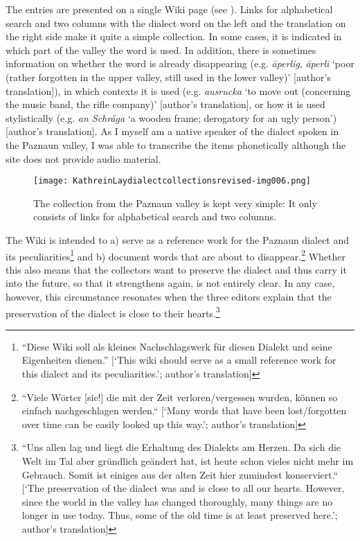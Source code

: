\documentclass[output=paper]{langscibook}
\begin{document}
The entries are presented on a single Wiki page (see ). Links for alphabetical search and two columns with the dialect word on the left and the translation on the right side make it quite a simple collection. In some cases, it is indicated in which part of the valley the word is used. In addition, there is sometimes information on whether the word is already disappearing (e.g. \textit{āperlig}, \textit{āperli} ‘poor (rather forgotten in the upper valley, still used in the lower valley)’ [author’s translation]), in which contexts it is used (e.g. \textit{ausrucka} ‘to move out (concerning the music band, the rifle company)’ [author’s translation], or how it is used stylistically (e.g. \textit{an Schråga} `a wooden frame; derogatory for an ugly person') [author’s translation]. As I myself am a native speaker of the dialect spoken in the Paznaun valley, I was able to transcribe the items phonetically although the site does not provide audio material.

 

\begin{figure}
\texttt{[image: KathreinLaydialectcollectionsrevised-img006.png]}
\caption{\label{fig:kathrein:6} The collection from the Paznaun valley is kept very simple: It only consists of links for alphabetical search and two columns.}
\end{figure}

The Wiki is intended to a) serve as a reference work for the Paznaun dialect and its peculiarities\footnote{“Diese Wiki soll als kleines Nachschlagswerk für diesen Dialekt und seine Eigenheiten dienen.” [‘This wiki should serve as a small reference work for this dialect and its peculiarities.’; author’s translation]} and b) document words that are about to disappear.\footnote{“Viele Wörter [sic!] die mit der Zeit verloren/vergessen wurden, können so einfach nachgeschlagen werden.“ [‘Many words that have been lost/forgotten over time can be easily looked up this way.’; author’s translation]} Whether this also means that the collectors want to preserve the dialect and thus carry it into the future, so that it strengthens again, is not entirely clear. In any case, however, this circumstance resonates when the three editors explain that the preservation of the dialect is close to their hearts.\footnote{“Uns allen lag und liegt die Erhaltung des Dialekts am Herzen. Da sich die Welt im Tal aber gründlich geändert hat, ist heute schon vieles nicht mehr im Gebrauch. Somit ist einiges aus der alten Zeit hier zumindest konserviert.“ [‘The preservation of the dialect was and is close to all our hearts. However, since the world in the valley has changed thoroughly, many things are no longer in use today. Thus, some of the old time is at least preserved here.’; author’s translation]}
\end{document}
